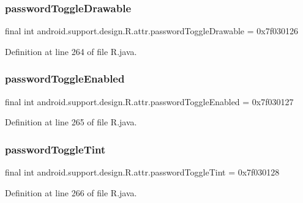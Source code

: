 \subsubsection{\texorpdfstring{passwordToggleDrawable}{passwordToggleDrawable}}
{\footnotesize\ttfamily final int android.\+support.\+design.\+R.\+attr.\+password\+Toggle\+Drawable = 0x7f030126\hspace{0.3cm}{\ttfamily [static]}}



Definition at line 264 of file R.\+java.

\mbox{\label{classandroid_1_1support_1_1design_1_1_r_1_1attr_a4ceee1c320b22ad02f77a85e0ccc11d6}} 
\subsubsection{\texorpdfstring{passwordToggleEnabled}{passwordToggleEnabled}}
{\footnotesize\ttfamily final int android.\+support.\+design.\+R.\+attr.\+password\+Toggle\+Enabled = 0x7f030127\hspace{0.3cm}{\ttfamily [static]}}



Definition at line 265 of file R.\+java.

\mbox{\label{classandroid_1_1support_1_1design_1_1_r_1_1attr_aa16735a90d99a10e9b107a62d47899c3}} 
\subsubsection{\texorpdfstring{passwordToggleTint}{passwordToggleTint}}
{\footnotesize\ttfamily final int android.\+support.\+design.\+R.\+attr.\+password\+Toggle\+Tint = 0x7f030128\hspace{0.3cm}{\ttfamily [static]}}



Definition at line 266 of file R.\+java.

